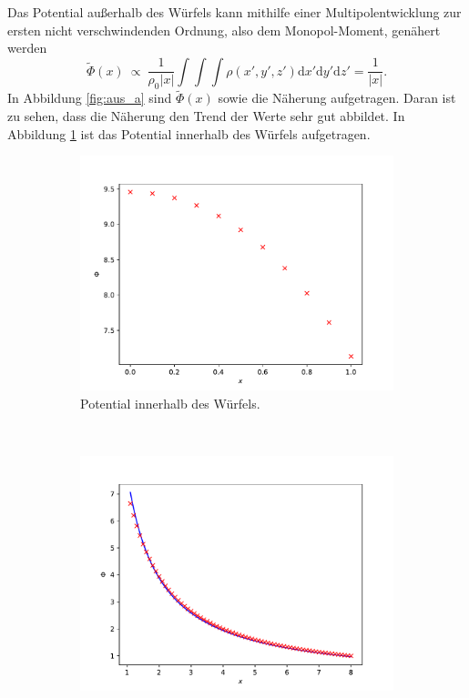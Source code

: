 Das Potential außerhalb des Würfels kann mithilfe einer Multipolentwicklung zur ersten nicht verschwindenden Ordnung, also dem Monopol-Moment, genähert werden
\begin{equation*}
  \tilde{\Phi}(x) \: \propto \: \frac{1}{\rho_0 |x|} \int \int \int \rho(x', y', z') \mathrm{d}x'\mathrm{d}y'\mathrm{d}z' = \frac{1}{|x|}.
\end{equation*}
In Abbildung \ref{fig:aus_a} sind \(\tilde{\Phi}(x)\) sowie die Näherung aufgetragen. Daran ist zu sehen, dass die Näherung den Trend der Werte sehr gut abbildet.
In Abbildung \ref{fig:inn_a} ist das Potential innerhalb des Würfels aufgetragen.
\begin{figure}
  \centering
  \begin{subfigure}[b]{0.45\textwidth}
      \includegraphics[width=\textwidth]{A2/build/innerhalb_a.pdf}
      \caption{Potential innerhalb des Würfels.}
      \label{fig:inn_a}
    \end{subfigure}
    ~ %
    \begin{subfigure}[b]{0.45\textwidth}
      \includegraphics[width=\textwidth]{A2/build/ausserhalb_a.pdf}

\end{subfigure}
\end{figure}
